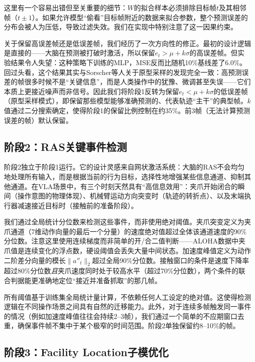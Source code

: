\documentclass[11pt,a4paper,fontset=none]{ctexart}
\begin{document}
这里有一个容易出错但至关重要的细节：$W$的拟合样本必须排除目标帧$t$及其相邻帧（$t\pm1$）。如果允许模型“偷看”目标帧附近的数据来拟合参数，整个预测误差的分布会被人为压低，导致过滤失效。我们在实现中特别注意了这一因果约束。

关于保留高误差帧还是低误差帧，我们经历了一次方向性的修正。最初的设计逻辑是直接的——大脑在预测被打破时激活，所以保留$e_t > \mu + k\sigma$的高误差帧。但实验结果令人失望：这种策略下训练的MLP，MSE反而比随机10\%基线差了6.0\%。回过头看，这个结果其实与Sorscher等人\cite{sorscher2022beyond}关于原型采样的发现完全一致：高预测误差的帧很多时候不是“关键信息”，而是人类操作中的犹豫、微调甚至失误——它们本质上更接近噪声而非信号。因此我们将阶段1反转为保留$e_t < \mu + k\sigma$的低误差帧（原型采样模式），即保留那些模型能够准确预测的、代表轨迹“主干”的典型帧。$k$值通过二分搜索确定，使得阶段1的保留比例控制在约35\%。前3帧（无法计算预测误差的帧）默认保留。

\subsection{阶段2：RAS关键事件检测}

阶段2独立于阶段1运行。它的设计灵感来自网状激活系统：大脑的RAS不会均匀地处理所有输入，而是根据当前的行为目标，选择性地增强某些信息通道、抑制其他通道。在VLA场景中，有三个时刻天然具有“高信息效用”：夹爪开始闭合的瞬间（操作意图的物理体现）、机械臂运动方向突变时（轨迹的转折点）、以及末端执行器减速接近目标时（接触前的准备阶段）。

我们通过全局统计分位数来检测这些事件，而非使用绝对阈值。夹爪突变定义为夹爪通道（7维动作向量的最后一个分量）的速度绝对值超过全体该通道速度的90\%分位数。注意这里使用连续梯度而非简单的开/合二值判断——ALOHA数据中夹爪值是连续变化的浮点数，硬设阈值会丢失大量中间状态。加速度峰值定义为动作二阶差分向量的模长$\|a''_t\|_2$超过全局90\%分位数。接触窗口的条件是速度下降率超过80\%分位数\textit{且}夹爪速度同时处于较高水平（超过70\%分位数），两个条件的联合判据能更准确地定位“接近并准备抓取”的那几帧。

所有阈值基于训练集全局统计量计算，不依赖任何人工设定的绝对值。这使得检测逻辑在不同操作场景之间具有自然的迁移能力。此外，对于连续多帧触发同一事件的情况（例如加速度峰值往往会持续2--3帧），我们通过一个简单的不应期窗口去重，确保事件帧不集中于某个极窄的时间范围。阶段2单独保留约8--10\%的帧。

\subsection{阶段3：Facility Location子模优化}
\end{document}
